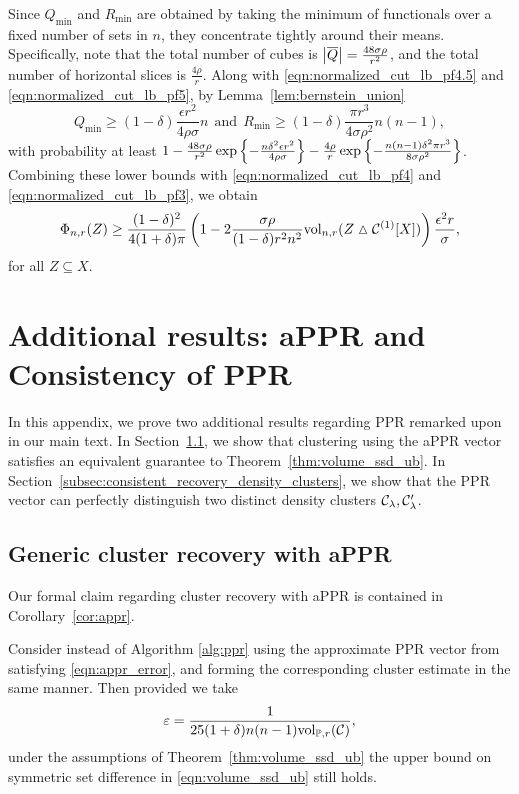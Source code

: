 	Since $Q_{\min}$ and $R_{\min}$ are obtained by taking the minimum of functionals over a fixed number of sets in $n$, they concentrate tightly around their means. Specifically, note that the total number of cubes is $\left \lvert \overline{Q} \right \rvert = \frac{48 \sigma \rho}{r^2}$, and the total number of horizontal slices is $\frac{4\rho}{r}$. Along with \eqref{eqn:normalized_cut_lb_pf4.5} and \eqref{eqn:normalized_cut_lb_pf5}, by Lemma~\ref{lem:bernstein_union} 
	\begin{equation*}
	Q_{\min} \geq (1 - \delta)\frac{\epsilon r^2}{4 \rho \sigma}n ~~\textrm{and}~~ R_{\min} \geq (1 - \delta)\frac{\pi r^3}{4\sigma \rho^2 }n(n - 1),
	\end{equation*}
	with probability at least $1 - \frac{48 \sigma \rho}{r^2}\exp\left\{-\frac{n\delta^2\epsilon r^2}{4 \rho \sigma}\right\} - \frac{4\rho}{r}\exp\left\{-\frac{n(n - 1)\delta^2\pi r^3}{8\sigma\rho^2}\right\}$. Combining these lower bounds with \eqref{eqn:normalized_cut_lb_pf4} and \eqref{eqn:normalized_cut_lb_pf3}, we obtain 
	\begin{equation*}	
	\Phi_{n,r}(Z) \geq \frac{(1 - \delta)^2}{4(1 + \delta)\pi} \left(1 - 2 \frac{\sigma \rho}{(1 - \delta) r^2 n^2} \mathrm{vol}_{n,r}(Z \vartriangle \mathcal{C}^{(1)}[X]) \right) \frac{\epsilon^2 r}{\sigma},
	\end{equation*}
	for all $Z \subseteq X$.

\section{Additional results: aPPR and Consistency of PPR}
\label{apdx:appr_misclassification_error}
In this appendix, we prove two additional results regarding PPR remarked upon in our main text. In Section~\ref{subsec:appr_volume_ssd_ub}, we show that clustering using the aPPR vector satisfies an equivalent guarantee to Theorem~\ref{thm:volume_ssd_ub}. In Section~\ref{subsec:consistent_recovery_density_clusters}, we show that the PPR vector can perfectly distinguish two distinct density clusters $\mathcal{C}_{\lambda},\mathcal{C}_{\lambda}'$. 

\subsection{Generic cluster recovery with aPPR}
\label{subsec:appr_volume_ssd_ub}
Our formal claim regarding cluster recovery with aPPR is contained in Corollary~\ref{cor:appr}.
\begin{corollary}
	\label{cor:appr}
	Consider instead of
	Algorithm \ref{alg:ppr} using the approximate PPR vector from
	\citet{andersen2006} satisfying \eqref{eqn:appr_error}, and forming the 
	corresponding cluster estimate  in the same manner.  Then 
	provided we take 
	\begin{equation}
	\label{eqn:appr_parameter}
	\varepsilon = \frac{1}{25(1 + \delta)n(n - 1)\mathrm{vol}_{\mathbb{P},r}(\mathcal{C})} ,
	\end{equation}
	under the assumptions of Theorem~\ref{thm:volume_ssd_ub} the upper bound on symmetric set difference in \eqref{eqn:volume_ssd_ub} still
	holds.
\end{corollary}	
